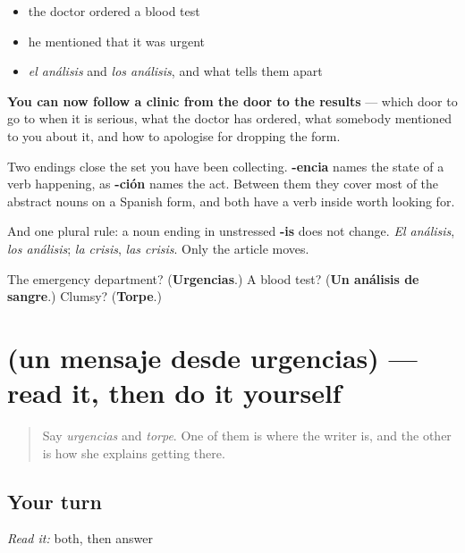 \begin{itemize}
\raggedright
  \item the doctor ordered a blood test
  \item he mentioned that it was urgent
  \item \emph{el análisis} and \emph{los análisis}, and what tells them apart
\end{itemize}

\begin{grammarlens}[title={What you've built}]
\textbf{You can now follow a clinic from the door to the results} — which door to go to when it is serious, what the doctor has ordered, what somebody mentioned to you about it, and how to apologise for dropping the form.

Two endings close the set you have been collecting. \textbf{-encia} names the state of a verb happening, as \textbf{-ción} names the act. Between them they cover most of the abstract nouns on a Spanish form, and both have a verb inside worth looking for.

And one plural rule: a noun ending in unstressed \textbf{-is} does not change. \emph{El análisis}, \emph{los análisis}; \emph{la crisis}, \emph{las crisis}. Only the article moves.
\end{grammarlens}

\begin{tcolorbox}[breakable,colback=teal!4,colframe=teal!35!black,title={Before you move on}]
The emergency department? (\textbf{Urgencias}.) A blood test? (\textbf{Un análisis de sangre}.) Clumsy? (\textbf{Torpe}.)
\end{tcolorbox}
\section[Practice]{(un mensaje desde urgencias) — read it, then do it yourself}

\label{lesson:ES-C447-sintesis-juicio}



\begin{quote}
Say \emph{urgencias} and \emph{torpe}. One of them is where the writer is, and the other is how she explains getting there.
\end{quote}

\subsection*{Your turn}
\emph{Read it:} both, then answer

